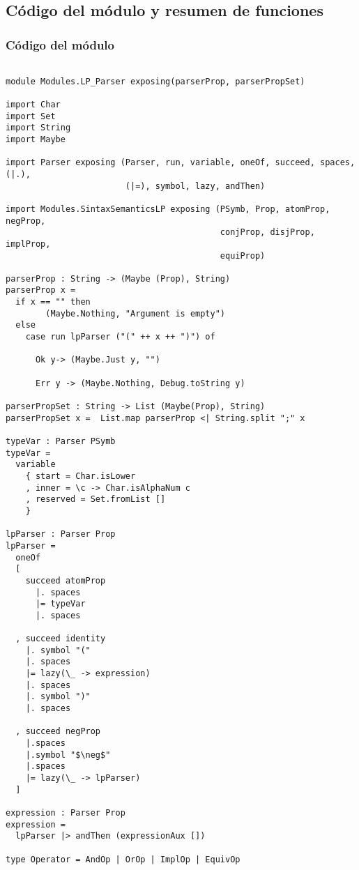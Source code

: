 \documentclass[a4paper]{report}
\begin{document}
\subsection{Código del módulo y resumen de funciones}

\subsubsection{Código del módulo}

\begin{lstlisting}[caption={Módulo LP\_Parser}, mathescape=true]

module Modules.LP_Parser exposing(parserProp, parserPropSet)

import Char
import Set
import String
import Maybe

import Parser exposing (Parser, run, variable, oneOf, succeed, spaces, (|.), 
                        (|=), symbol, lazy, andThen)

import Modules.SintaxSemanticsLP exposing (PSymb, Prop, atomProp, negProp, 
                                           conjProp, disjProp, implProp, 
                                           equiProp)

parserProp : String -> (Maybe (Prop), String)
parserProp x =
  if x == "" then
        (Maybe.Nothing, "Argument is empty")
  else
    case run lpParser ("(" ++ x ++ ")") of
      
      Ok y-> (Maybe.Just y, "")

      Err y -> (Maybe.Nothing, Debug.toString y)

parserPropSet : String -> List (Maybe(Prop), String)
parserPropSet x =  List.map parserProp <| String.split ";" x

typeVar : Parser PSymb
typeVar =
  variable
    { start = Char.isLower
    , inner = \c -> Char.isAlphaNum c
    , reserved = Set.fromList []
    }

lpParser : Parser Prop
lpParser =
  oneOf 
  [ 
    succeed atomProp
      |. spaces
      |= typeVar
      |. spaces

  , succeed identity 
    |. symbol "("
    |. spaces
    |= lazy(\_ -> expression)
    |. spaces
    |. symbol ")"
    |. spaces  
  
  , succeed negProp
    |.spaces
    |.symbol "$\neg$"
    |.spaces
    |= lazy(\_ -> lpParser)
  ]

expression : Parser Prop
expression =
  lpParser |> andThen (expressionAux [])

type Operator = AndOp | OrOp | ImplOp | EquivOp


\end{lstlisting}
\end{document}
